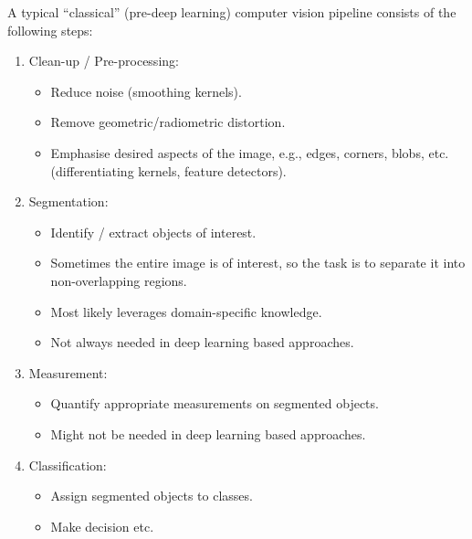 \documentclass[a4paper,11pt]{article}
\begin{document}
A typical ``classical'' (pre-deep learning) computer vision pipeline consists of the following steps:
\begin{enumerate}
    \item   Clean-up / Pre-processing:
            \begin{itemize}
                \item   Reduce noise (smoothing kernels).
                \item   Remove geometric/radiometric distortion.
                \item   Emphasise desired aspects of the image, e.g., edges, corners, blobs, etc. (differentiating kernels, feature detectors).
            \end{itemize}

    \item   Segmentation:
            \begin{itemize}
                \item   Identify / extract objects of interest.
                \item   Sometimes the entire image is of interest, so the task is to separate it into non-overlapping regions.
                \item   Most likely leverages domain-specific knowledge.
                \item   Not always needed in deep learning based approaches.
            \end{itemize}

    \item   Measurement:
            \begin{itemize}
                \item   Quantify appropriate measurements on segmented objects.
                \item   Might not be needed in deep learning based approaches.
            \end{itemize}

    \item   Classification:
            \begin{itemize}
                \item   Assign segmented objects to classes.
                \item   Make decision etc.
            \end{itemize}
\end{enumerate}
\end{document}
